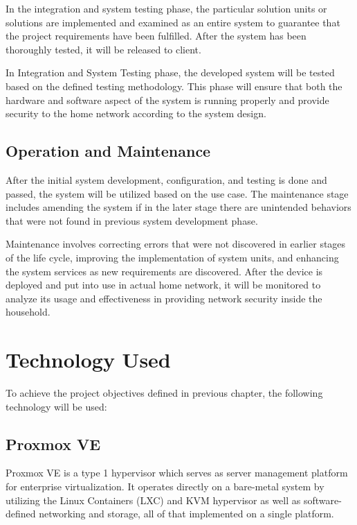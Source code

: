 \documentclass[../index.tex]{subfiles}
\begin{document}
In the integration and system testing phase, the particular solution units or solutions are
implemented and examined as an entire system to guarantee that the project requirements have been
fulfilled. After the system has been thoroughly tested, it will be released to client.

In Integration and System Testing phase, the developed system will be tested based on the defined
testing methodology. This phase will ensure that both the hardware and software aspect of the system
is running properly and provide security to the home network according to the system design.


\subsection{Operation and Maintenance}

After the initial system development, configuration, and testing is done and passed, the system will
be utilized based on the use case. The maintenance stage includes amending the system if in the
later stage there are unintended behaviors that were not found in previous system development phase.

Maintenance involves correcting errors that were not discovered in earlier stages of the life cycle,
improving the implementation of system units, and enhancing the system services as new requirements
are discovered. After the device is deployed and put into use in actual home network, it will be
monitored to analyze its usage and effectiveness in providing network security inside the household.

\section{Technology Used}

To achieve the project objectives defined in previous chapter, the following technology will be
used:

\subsection{Proxmox VE}

Proxmox VE is a type 1 hypervisor which serves as server management platform for enterprise
virtualization. It operates directly on a bare-metal system by utilizing the Linux Containers (LXC)
and KVM hypervisor as well as software-defined networking and storage, all of that implemented on a
single platform.
\end{document}

